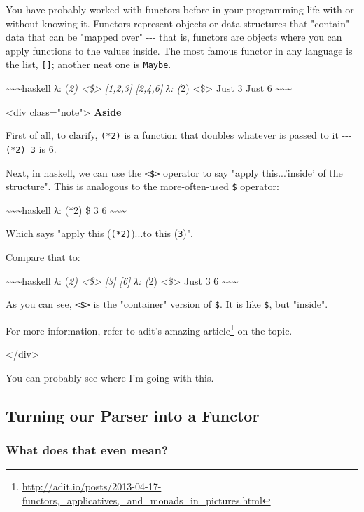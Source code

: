 \documentclass[]{article}
\renewcommand{\href}[2]{#2\footnote{\url{#1}}}
\begin{document}
You have probably worked with functors before in your programming life with or
without knowing it. Functors represent objects or data structures that "contain"
data that can be "mapped over" -\/-\/- that is, functors are objects where you
can apply functions to the values inside. The most famous functor in any
language is the list, \texttt{{[}{]}}; another neat one is \texttt{Maybe}.

\textasciitilde{}\textasciitilde{}\textasciitilde{}haskell λ: (\emph{2)
\textless{}\$\textgreater{} {[}1,2,3{]} {[}2,4,6{]} λ: (}2)
\textless{}\$\textgreater{} Just 3 Just 6
\textasciitilde{}\textasciitilde{}\textasciitilde{}

\textless{}div class="note"\textgreater{} \textbf{Aside}

First of all, to clarify, \texttt{(*2)} is a function that doubles whatever is
passed to it -\/-\/- \texttt{(*2)\ 3} is 6.

Next, in haskell, we can use the \texttt{\textless{}\$\textgreater{}} operator
to say "apply this...'inside' of the structure". This is analogous to the
more-often-used \texttt{\$} operator:

\textasciitilde{}\textasciitilde{}\textasciitilde{}haskell λ: (*2) \$ 3 6
\textasciitilde{}\textasciitilde{}\textasciitilde{}

Which says "apply this (\texttt{(*2)})...to this (\texttt{3})".

Compare that to:

\textasciitilde{}\textasciitilde{}\textasciitilde{}haskell λ: (\emph{2)
\textless{}\$\textgreater{} {[}3{]} {[}6{]} λ: (}2) \textless{}\$\textgreater{}
Just 3 6 \textasciitilde{}\textasciitilde{}\textasciitilde{}

As you can see, \texttt{\textless{}\$\textgreater{}} is the "container" version
of \texttt{\$}. It is like \texttt{\$}, but "inside".

For more information, refer to adit's
\href{http://adit.io/posts/2013-04-17-functors,_applicatives,_and_monads_in_pictures.html}{amazing
article} on the topic.

\textless{}/div\textgreater{}

You can probably see where I'm going with this.

\subsection{Turning our Parser into a Functor}

\subsubsection{What does that even mean?}
\end{document}
